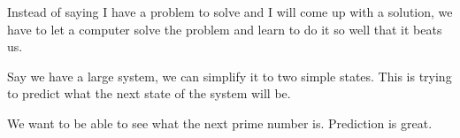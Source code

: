 \documentclass[12pt]{article}
\begin{document}
	

Instead of saying I have a problem to solve and I will come up with a solution, we have to let a computer solve the problem and learn to do it so well that it beats us.



Say we have a large system, we can simplify it to two simple states. This is trying to predict what the next state of the system will be. 





We want to be able to see what the next prime number is. Prediction is great.
\end{document}
